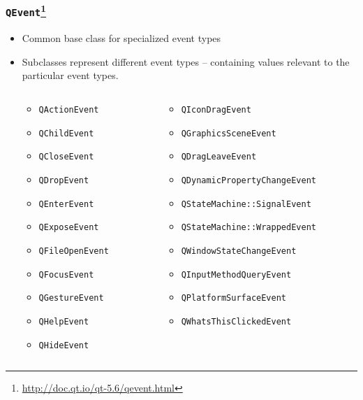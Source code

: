 \begin{frame}
  \frametitle{\texttt{QEvent}\footnote
    {\url{http://doc.qt.io/qt-5.6/qevent.html}}}
  \small
  \begin{itemize}
    \item Common base class for specialized event types
    \item Subclasses represent different event types -- containing values
      relevant to the particular event types.
    \begin{columns}
      \tiny
      \begin{column}{0.32\textwidth}
      \begin{itemize}
        \item \texttt{QActionEvent}
        \item \texttt{QChildEvent}
        \item \texttt{QCloseEvent}
        \item \texttt{QDropEvent}
        \item \texttt{QEnterEvent}
        \item \texttt{QExposeEvent}
        \item \texttt{QFileOpenEvent}
        \item \texttt{QFocusEvent}
        \item \texttt{QGestureEvent}
        \item \texttt{QHelpEvent}
        \item \texttt{QHideEvent}
      \end{itemize}
      \end{column}
      \begin{column}{0.36\textwidth}
      \begin{itemize}
        \item \texttt{QIconDragEvent}
        \item \texttt{QGraphicsSceneEvent}
        \item \texttt{QDragLeaveEvent}
        \item \texttt{QDynamicPropertyChangeEvent}
        \item \texttt{QStateMachine::SignalEvent}
        \item \texttt{QStateMachine::WrappedEvent}
        \item \texttt{QWindowStateChangeEvent}
        \item \texttt{QInputMethodQueryEvent}
        \item \texttt{QPlatformSurfaceEvent}
        \item \texttt{QWhatsThisClickedEvent}

\end{itemize}
\end{column}
\end{columns}
\end{itemize}
\end{frame}
